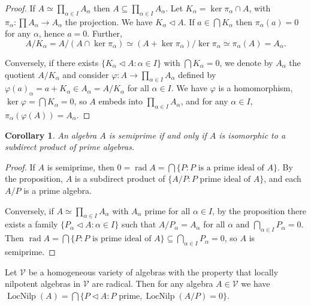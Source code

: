 \documentclass{article}
\newtheorem{corollary}[theorem]{Corollary}
\begin{document}
\begin{proof}
If $A \simeq \prod_{\alpha \in I} A_\alpha$ then $A \subseteq \prod_{\alpha \in I} A_\alpha$. Let $K_\alpha = \ker \pi_\alpha \cap A$, with $\pi_\alpha : \prod A_\alpha \to A_\alpha$ the projection. We have $K_\alpha \triangleleft A$. If $a \in \bigcap K_\alpha$ then $\pi_\alpha(a)=0$ for any $\alpha$, hence $a=0$. Further,
\[
A / K_\alpha = A / (A \cap \ker \pi_\alpha) \simeq (A + \ker \pi_\alpha)/\ker \pi_\alpha \simeq \pi_\alpha(A) = A_\alpha.
\]

Conversely, if there exists $\{K_\alpha \triangleleft A : \alpha \in I\}$ with $\bigcap K_\alpha = 0$, we denote by $A_\alpha$ the quotient $A / K_\alpha$ and consider $\varphi : A \to \prod_{\alpha \in I} A_\alpha$ defined by $\varphi(a)_\alpha = a + K_\alpha \in A_\alpha = A / K_\alpha$ for all $\alpha \in I$. We have $\varphi$ is a homomorphism, $\ker \varphi = \bigcap K_\alpha = 0$, so $A$ embeds into $\prod_{\alpha \in I} A_\alpha$, and for any $\alpha \in I$, $\pi_\alpha(\varphi(A)) = A_\alpha$.
\end{proof}

\begin{corollary}
An algebra $A$ is semiprime if and only if $A$ is isomorphic to a subdirect product of prime algebras.
\end{corollary}

\begin{proof}
If $A$ is semiprime, then $0 = \operatorname{rad} A = \bigcap \{P : P \text{ is a prime ideal of } A\}$. By the proposition, $A$ is a subdirect product of $\{A / P : P \text{ prime ideal of } A\}$, and each $A / P$ is a prime algebra.

Conversely, if $A \simeq \prod_{\alpha \in I} A_\alpha$ with $A_\alpha$ prime for all $\alpha \in I$, by the proposition there exists a family $\{P_\alpha \triangleleft A : \alpha \in I\}$ such that $A / P_\alpha = A_\alpha$ for all $\alpha$ and $\bigcap_{\alpha \in I} P_\alpha = 0$. Then $\operatorname{rad} A = \bigcap \{P : P \text{ is prime ideal of } A\} \subseteq \bigcap_{\alpha \in I} P_\alpha = 0$, so $A$ is semiprime.
\end{proof}

\begin{theorem}
Let $\mathcal{V}$ be a homogeneous variety of algebras with the property that locally nilpotent algebras in $\mathcal{V}$ are radical. Then for any algebra $A \in \mathcal{V}$ we have $\operatorname{LocNilp}(A) = \bigcap \{P \triangleleft A : P \text{ prime}, \operatorname{LocNilp}(A/P)=0\}$.
\end{theorem}
\end{document}
